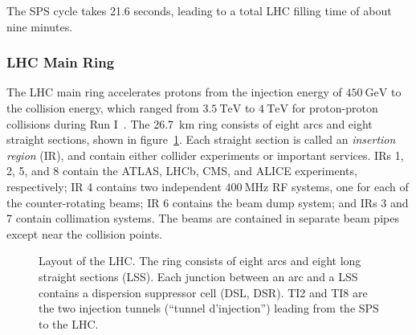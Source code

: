 The SPS cycle takes 21.6 seconds, leading to a total LHC filling time of about nine minutes.

\subsubsection{LHC Main Ring}
The LHC main ring accelerates protons from the injection energy of $\SI{450}{\giga\electronvolt}$ to the collision energy, which ranged from $\SI{3.5}{\tera\electronvolt}$ to $\SI{4}{\tera\electronvolt}$ for proton-proton collisions during Run I~\cite{Bruning:2004ej}. The \SI{26.7}{\kilo\meter} ring consists of eight arcs and eight straight sections, shown in figure~\ref{fig:LHC-segments}. Each straight section is called an \emph{insertion region} (IR), and contain either collider experiments or important services. IRs 1, 2, 5, and 8 contain the ATLAS, LHCb, CMS, and ALICE experiments, respectively; IR 4 contains two independent $\SI{400}{\mega\hertz}$ RF systems, one for each of the counter-rotating beams; IR 6 contains the beam dump system; and IRs 3 and 7 contain collimation systems. The beams are contained in separate beam pipes except near the collision points.

\begin{figure}[htbp]
	\centering
	\caption{Layout of the LHC. The ring consists of eight arcs and eight long straight sections (LSS). Each junction between an arc and a LSS contains a dispersion suppressor cell (DSL, DSR). TI2 and TI8 are the two injection tunnels (``tunnel d'injection'') leading from the SPS to the LHC.}
	\label{fig:LHC-segments}
\end{figure}


